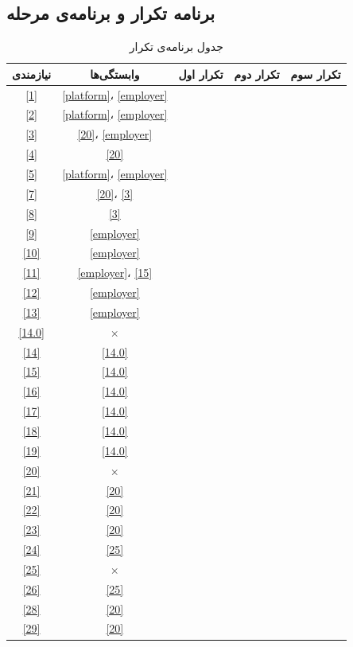 \documentclass[12pt, svgnames]{book}
\begin{document}
	\subsection{برنامه تکرار و برنامه‌ی مرحله}
	\begin{center}
		\begin{longtable}{|c|c|c|c|c|}
			\caption{جدول برنامه‌ی تکرار}
			\endfirsthead
			\endhead
			\hline
			نیازمندی & وابستگی‌ها & تکرار اول & تکرار دوم & تکرار سوم \\
			\hline
			\hline
			\ref{1} & \ref{platform}، \ref{employer} & & & \\ \hline
			\ref{2} & \ref{platform}، \ref{employer} & \checkmark & & \\ \hline
			\ref{3} & \ref{20}، \ref{employer} & \checkmark & & \\ \hline
			\ref{4} & \ref{20} & \checkmark & & \\ \hline
			\ref{5} & \ref{platform}، \ref{employer} & \checkmark & & \\ \hline
			\ref{7} & \ref{20}، \ref{3} & & & \\ \hline
			\ref{8} & \ref{3} & \checkmark & & \\ \hline
			\ref{9} & \ref{employer} & \checkmark & & \\ \hline
			\ref{10} & \ref{employer} & \checkmark & & \\ \hline
			\ref{11} & \ref{employer}، \ref{15} & \checkmark & & \\ \hline
			\ref{12} & \ref{employer} & & & \\ \hline
			\ref{13} & \ref{employer} & \checkmark & & \\ \hline
			
			\ref{14.0} & $\times$ & \checkmark & & \\ \hline
			\ref{14} & \ref{14.0} & \checkmark & & \\ \hline
			\ref{15} & \ref{14.0} & \checkmark & & \\ \hline
			\ref{16} & \ref{14.0} & \checkmark & & \\ \hline
			\ref{17} & \ref{14.0} & \checkmark & & \\ \hline
			\ref{18} & \ref{14.0} & \checkmark & & \\ \hline
			\ref{19} & \ref{14.0} & \checkmark & & \\ \hline
			
			\ref{20} & $\times$ & \checkmark & & \\ \hline
			\ref{21} & \ref{20} & \checkmark & & \\ \hline
			\ref{22} & \ref{20} & \checkmark & & \\ \hline
			\ref{23} & \ref{20} & \checkmark & & \\ \hline
			\ref{24} & \ref{25} & \checkmark & & \\ \hline
			\ref{25} & $\times$ & \checkmark & & \\ \hline
			\ref{26} & \ref{25} & \checkmark & & \\ \hline
			\ref{28} & \ref{20} & \checkmark & & \\ \hline
			\ref{29} & \ref{20} & \checkmark & & \\ \hline
		\end{longtable}
	\end{center}
	
	
\end{document}
